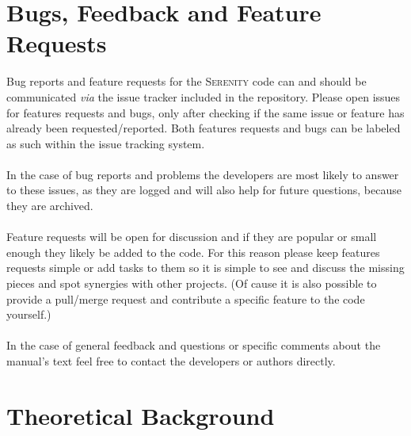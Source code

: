 \documentclass[bibliography=totocnumbered,a4paper,10pt,oneside]{scrbook}
\newcommand{
\serenity}{\textsc{Serenity}\xspace}
\begin{document}
\newpage
\chapter{Bugs, Feedback and Feature Requests}
Bug reports and feature requests for the \serenity code can and should be communicated \textit{via} the issue tracker included in the
repository. Please open issues for features requests and bugs, only after checking if the same issue or feature has already been requested/reported.
Both features requests and bugs can be labeled as such within the issue tracking system.\\
\\
In the case of bug reports and problems the developers are most likely to answer to these issues, as they are logged and will also help for future questions, because they
are archived. \\
\\
Feature requests will be open for discussion and if they are popular or small enough they likely be added to the code.
For this reason please keep features requests simple or add tasks to them so it is simple to see and discuss the missing pieces and spot
synergies with other projects.
(Of cause it is also possible to provide a pull/merge request and contribute a specific feature to the code yourself.)\\
\\
In the case of general feedback and questions or specific comments about the manual's text feel free to contact the developers or authors directly.

\clearpage
\chapter{Theoretical Background}












\clearpage
\end{document}
